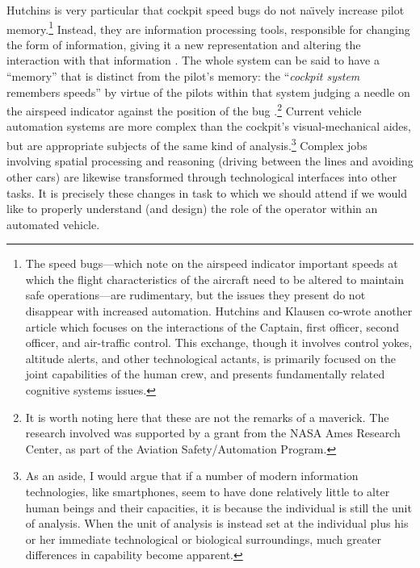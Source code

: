 Hutchins is very particular that cockpit speed bugs do not na\"{\i}vely
increase pilot memory.\footnote{The speed bugs---which note on the airspeed indicator
important speeds at which the 
flight characteristics of the aircraft need to be altered to maintain
safe operations---are rudimentary, but the issues they present do not disappear with
increased automation. Hutchins and Klausen co-wrote another
article \cite{hutchinsKlausen} which focuses on the
interactions of the Captain, first 
officer, second officer, and air-traffic control. This exchange,
though it involves control yokes, altitude alerts, and other
technological actants, is primarily focused on the joint capabilities
of the human crew, and presents fundamentally related cognitive
systems issues.} Instead, they 
are information processing tools, responsible for changing the form of
information, giving it a new representation and altering the
interaction with that information \cite[p. 282]{hutchinsCockpit}. The whole system can be said to
have a ``memory'' that is distinct from the pilot's memory: the
``\emph{cockpit system} remembers speeds'' by virtue of the pilots
within that system judging a needle on the airspeed indicator against
the position of the bug \cite[p.
  283]{hutchinsCockpit}.\footnote{It is 
  worth noting here that these are not the remarks of a maverick. The research involved
  was supported by a grant from the NASA Ames Research Center, as part
  of the Aviation Safety/Automation Program.}
Current vehicle automation systems are more complex than the cockpit's
visual-mechanical aides, but are appropriate subjects of the same kind
of analysis.\footnote{As an aside, I would argue that if a number of
  modern information technologies, like smartphones, seem to have done
relatively little to alter human beings and their capacities, it is
because the individual 
is still the unit of analysis. When the unit of analysis is instead
set at the individual plus his or her immediate technological or biological
surroundings, much greater differences in capability become apparent.}
Complex jobs involving spatial
processing and reasoning (driving between the lines and avoiding other
cars) are likewise transformed through technological interfaces into other
tasks. It is precisely these changes in task to which we should attend
if we would like to properly understand (and design) the role of the
operator within an automated vehicle. 


